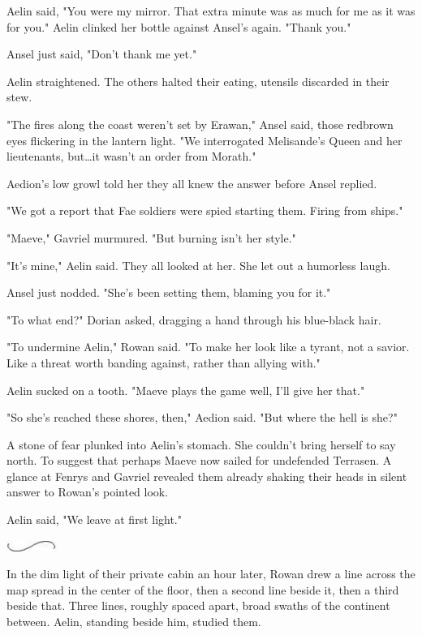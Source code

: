 Aelin said, "You were my mirror.
That extra minute was as much for me as it was for you."
Aelin clinked her bottle against Ansel's again.
"Thank you."

Ansel just said, "Don't thank me yet."

Aelin straightened.
The others halted their eating, utensils discarded in their stew.

"The fires along the coast weren't set by Erawan," Ansel said, those redbrown eyes flickering in the lantern light.
"We interrogated Melisande's Queen and her lieutenants, but\ldots it wasn't an order from Morath."

Aedion's low growl told her they all knew the answer before Ansel replied.

"We got a report that Fae soldiers were spied starting them.
Firing from ships."

"Maeve," Gavriel murmured.
"But burning isn't her style."

"It's mine," Aelin said.
They all looked at her.
She let out a humorless laugh.

Ansel just nodded.
"She's been setting them, blaming you for it."

"To what end?"
Dorian asked, dragging a hand through his blue-black hair.

"To undermine Aelin," Rowan said.
"To make her look like a tyrant, not a savior.
Like a threat worth banding against, rather than allying with."

Aelin sucked on a tooth.
"Maeve plays the game well, I'll give her that."

"So she's reached these shores, then," Aedion said.
"But where the hell is she?"

A stone of fear plunked into Aelin's stomach.
She couldn't bring herself to say north.
To suggest that perhaps Maeve now sailed for undefended Terrasen.
A glance at Fenrys and Gavriel revealed them already shaking their heads in silent answer to Rowan's pointed look.

Aelin said, "We leave at first light."

\begin{center}
	\includegraphics[width=0.65in,height=0.13in]{images/seperator}
\end{center}

In the dim light of their private cabin an hour later, Rowan drew a line across the map spread in the center of the floor, then a second line beside it, then a third beside that.
Three lines, roughly spaced apart, broad swaths of the continent between.
Aelin, standing beside him, studied them.

